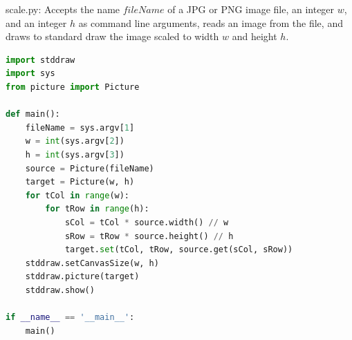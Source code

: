 \documentclass[8pt,a4paper,compress,handout]{beamer}
\begin{document}
\begin{frame}[fragile]
\begin{framed}
\tiny scale.py: Accepts the name $fileName$ of a JPG or PNG image file, an integer $w$, and an integer $h$ as command line arguments, reads an image from the file, and draws to standard draw the image scaled to width $w$ and height $h$.
\end{framed}

\begin{lstlisting}[language=Python]
import stddraw
import sys
from picture import Picture

def main():
    fileName = sys.argv[1]
    w = int(sys.argv[2])
    h = int(sys.argv[3])
    source = Picture(fileName)
    target = Picture(w, h)
    for tCol in range(w):
        for tRow in range(h):
            sCol = tCol * source.width() // w
            sRow = tRow * source.height() // h
            target.set(tCol, tRow, source.get(sCol, sRow))
    stddraw.setCanvasSize(w, h)
    stddraw.picture(target)
    stddraw.show()

if __name__ == '__main__':
    main()
\end{lstlisting}
\end{frame}
\end{document}

